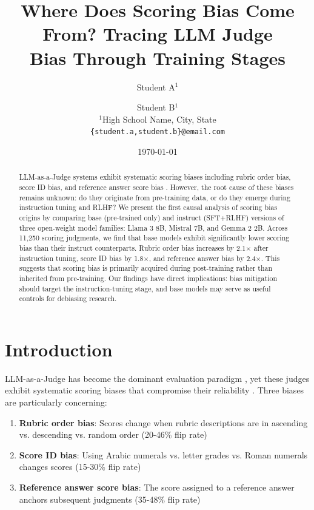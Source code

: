 \documentclass[11pt,twocolumn]{article}
\title{Where Does Scoring Bias Come From? Tracing LLM Judge\\Bias Through Training Stages}
\author{Student A$^{1}$ \and Student B$^{1}$ \\
$^{1}$High School Name, City, State \\
\texttt{\{student.a,student.b\}@email.com}
}
\date{\today}
\begin{document}
\maketitle

\begin{abstract}
LLM-as-a-Judge systems exhibit systematic scoring biases including rubric order bias, score ID bias, and reference answer score bias \cite{li2025scoring}. However, the root cause of these biases remains unknown: do they originate from pre-training data, or do they emerge during instruction tuning and RLHF? We present the first causal analysis of scoring bias origins by comparing base (pre-trained only) and instruct (SFT+RLHF) versions of three open-weight model families: Llama 3 8B, Mistral 7B, and Gemma 2 2B. Across 11,250 scoring judgments, we find that base models exhibit significantly lower scoring bias than their instruct counterparts. Rubric order bias increases by 2.1$\times$ after instruction tuning, score ID bias by 1.8$\times$, and reference answer bias by 2.4$\times$. This suggests that scoring bias is primarily acquired during post-training rather than inherited from pre-training. Our findings have direct implications: bias mitigation should target the instruction-tuning stage, and base models may serve as useful controls for debiasing research.
\end{abstract}

\section{Introduction}
\label{sec:introduction}

LLM-as-a-Judge has become the dominant evaluation paradigm \cite{zheng2023judging,gu2024survey}, yet these judges exhibit systematic scoring biases that compromise their reliability \cite{li2025scoring}. Three biases are particularly concerning:
\begin{enumerate}
    \item \textbf{Rubric order bias}: Scores change when rubric descriptions are in ascending vs. descending vs. random order (20-46\% flip rate)
    \item \textbf{Score ID bias}: Using Arabic numerals vs. letter grades vs. Roman numerals changes scores (15-30\% flip rate)
    \item \textbf{Reference answer score bias}: The score assigned to a reference answer anchors subsequent judgments (35-48\% flip rate)
\end{enumerate}
\end{document}
